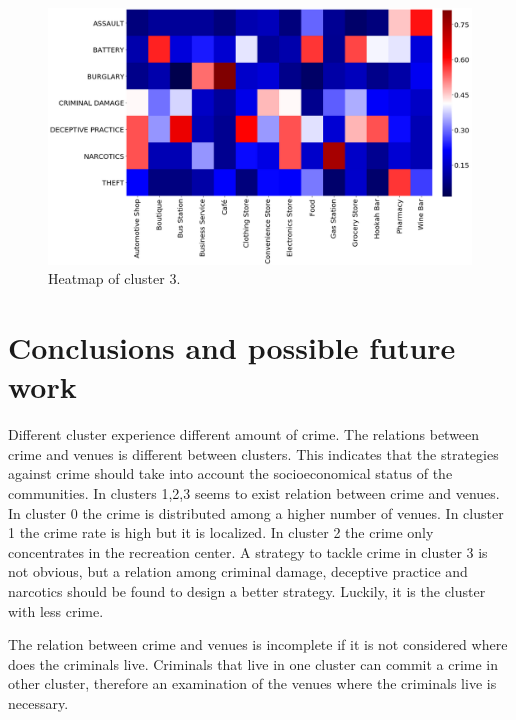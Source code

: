 \documentclass[a4paper,12pt]{article}
\begin{document}
\begin{figure}[hb]
\centering 
\includegraphics[scale=0.65]{Heatmap_cluster_3} 
\caption{Heatmap of cluster 3. 
\label{fig:cluster_3}} 
\end{figure}

\section{Conclusions and possible future work}
Different cluster experience different amount of crime. The relations between crime and venues is different between clusters. This indicates that the strategies against crime should take into account the socioeconomical status of the communities. In clusters 1,2,3 seems to exist relation between crime and venues. In cluster 0 the crime is distributed among a higher number of venues. In cluster 1 the crime rate is high but it is localized. In cluster 2 the crime only concentrates in the recreation center. A strategy to tackle crime in cluster 3 is not obvious, but a relation among criminal damage, deceptive practice and narcotics should be found to design a better strategy. Luckily, it is the cluster with less crime.

The relation between crime and venues is incomplete if it is not considered where does the criminals live. Criminals that live in one cluster can commit a crime in other cluster, therefore an examination of the venues where the criminals live is necessary. 

    
\end{document}
